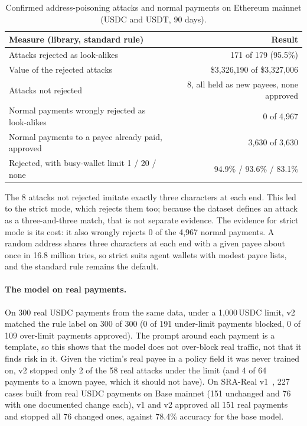 \documentclass[11pt]{article}
\begin{document}
\begin{table}[t]
\centering
\small
\begin{tabular}{lr}
\toprule
Measure (library, standard rule) & Result \\
\midrule
Attacks rejected as look-alikes & 171 of 179 (95.5\%) \\
Value of the rejected attacks & \$3,326,190 of \$3,327,006 \\
Attacks not rejected & 8, all held as new payees, none approved \\
Normal payments wrongly rejected as look-alikes & 0 of 4,967 \\
Normal payments to a payee already paid, approved & 3,630 of 3,630 \\
\midrule
Rejected, with busy-wallet limit 1 / 20 / none & 94.9\% / 93.6\% / 83.1\% \\
\bottomrule
\end{tabular}
\caption{Confirmed address-poisoning attacks and normal payments on Ethereum mainnet (USDC and USDT, 90 days).}
\label{tab:poisoning}
\end{table}

The 8 attacks not rejected imitate exactly three characters at each end. This led to the strict mode, which rejects them too; because the dataset defines an attack as a three-and-three match, that is not separate evidence. The evidence for strict mode is its cost: it also wrongly rejects 0 of the 4,967 normal payments. A random address shares three characters at each end with a given payee about once in 16.8 million tries, so strict suits agent wallets with modest payee lists, and the standard rule remains the default.

\paragraph{The model on real payments.} On 300 real USDC payments from the same data, under a 1,000\,USDC limit, v2 matched the rule label on 300 of 300 (0 of 191 under-limit payments blocked, 0 of 109 over-limit payments approved). The prompt around each payment is a template, so this shows that the model does not over-block real traffic, not that it finds risk in it. Given the victim's real payee in a policy field it was never trained on, v2 stopped only 2 of the 58 real attacks under the limit (and 4 of 64 payments to a known payee, which it should not have). On SRA-Real v1~\cite{sraReal}, 227 cases built from real USDC payments on Base mainnet (151 unchanged and 76 with one documented change each), v1 and v2 approved all 151 real payments and stopped all 76 changed ones, against 78.4\% accuracy for the base model.
\end{document}
